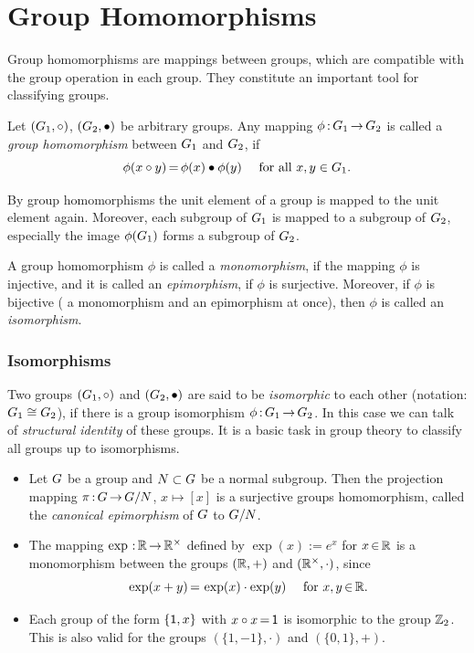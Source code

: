 \documentclass[11pt,twoside]{article}
\begin{document}
\part{Group Homomorphisms}                                                     %
Group homomorphisms are mappings between groups,
which are compatible with the group operation in each group.
They constitute an important tool for classifying groups.

\subparagraph{}
Let $(G_1,\circ)$, $(G_2,\bullet)$ be arbitrary groups.
Any mapping $\phi {\,:\,} G_1 {\,\to\,} G_2$ is called
a \textit{group homomorphism} between $G_1$ and $G_2$,
if
\[
\phi(x \circ y) {\,=\,} \phi(x) \bullet \phi(y) \quad \mbox{ for all } x,y \in G_1.
\]

\subparagraph{}
By group homomorphisms the unit element of a group is mapped
to the unit element again.
Moreover,
each subgroup of $G_1$ is mapped to a subgroup of $G_2$,
especially the image $\phi(G_1)$ forms a subgroup of $G_2$.

\subparagraph{}
A group homomorphism $\phi$ is called a \textit{monomorphism},
if the mapping $\phi$ is injective,
and it is called an \textit{epimorphism},
if $\phi$ is surjective.
Moreover,
if $\phi$ is bijective ({\ie} a monomorphism and an epimorphism at once),
then $\phi$ is called an \textit{isomorphism}.

\section{Isomorphisms}
Two groups $(G_1,\circ)$ and $(G_2,\bullet)$ are said to be
\textit{isomorphic} to each other
(notation: $G_1 \cong G_2$),
if there is a group isomorphism $\phi {\,:\,} G_1 {\,\to\,} G_2$.
In this case we can talk of \textit{structural identity}
of these groups.
It is a basic task in group theory to classify all groups up to isomorphisms.

\begin{itemize}[leftmargin=15pt]
\item[1.]
Let $G$ be a group and $N \subset G$ be a normal subgroup.
Then the projection mapping $\pi{\,:\,}G {\,\to\,} G/N$, $x \mapsto [x]$
is a surjective groups homomorphism,
called the \textit{canonical epimorphism} of $G$ to $G/N$.

\item[2.]
The mapping $\exp{\,:\,}{\mathbb{R}} {\,\to\,} {\mathbb{R}}^{\times}$ defined by
$\exp(x) := e^x$ for $x {\,\in\,} {\mathbb{R}}$ is a monomorphism
between the groups $({\mathbb{R}},+)$ and $({\mathbb{R}}^{\times}, \cdot)$,
since
\[
\exp(x+y) {\,=\,} \exp(x) \cdot \exp(y) \quad \mbox{ for } x,y {\,\in\,} {\mathbb{R}}.
\]

\item[3.]
Each group of the form $\{{\mathsf{1}},x\}$ with $x \circ x {\,=\,} {\mathsf{1}}$
is isomorphic to the group ${\mathbb{Z}}_2$.
This is also valid for the groups $(\{1,-1\}, \cdot)$ and $(\{0,1\},+)$.
\end{itemize}
\end{document}
